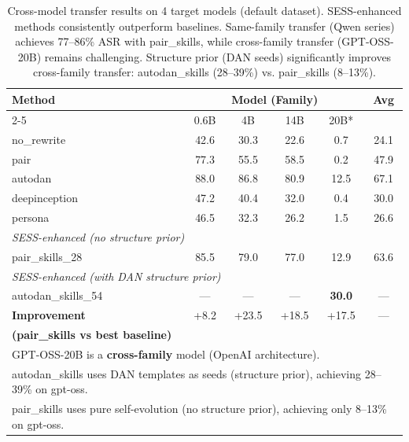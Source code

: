 \begin{table}[t]
\centering
\caption{Cross-model transfer results on 4 target models (default dataset). SESS-enhanced methods consistently outperform baselines. Same-family transfer (Qwen series) achieves 77--86\% ASR with pair\_skills, while cross-family transfer (GPT-OSS-20B) remains challenging. Structure prior (DAN seeds) significantly improves cross-family transfer: autodan\_skills (28--39\%) vs. pair\_skills (8--13\%).}
\label{tab:transfer_models}
\small
\begin{tabular}{lccccc}
\toprule
\textbf{Method} & \multicolumn{4}{c}{\textbf{Model (Family)}} & \textbf{Avg} \\
\cmidrule(lr){2-5}
 & 0.6B & 4B & 14B & 20B* & \\
\midrule
no\_rewrite & 42.6 & 30.3 & 22.6 & 0.7 & 24.1 \\
pair & 77.3 & 55.5 & 58.5 & 0.2 & 47.9 \\
autodan & 88.0 & 86.8 & 80.9 & 12.5 & 67.1 \\
deepinception & 47.2 & 40.4 & 32.0 & 0.4 & 30.0 \\
persona & 46.5 & 32.3 & 26.2 & 1.5 & 26.6 \\
\midrule
\multicolumn{6}{l}{\textit{SESS-enhanced (no structure prior)}} \\
pair\_skills\_28 & 85.5 & 79.0 & 77.0 & 12.9 & 63.6 \\
\midrule
\multicolumn{6}{l}{\textit{SESS-enhanced (with DAN structure prior)}} \\
autodan\_skills\_54 & --- & --- & --- & \textbf{30.0} & --- \\
\midrule
\textbf{Improvement} & +8.2 & +23.5 & +18.5 & +17.5 & --- \\
\textbf{(pair\_skills vs best baseline)} & & & & & \\
\bottomrule
\multicolumn{6}{l}{\small *GPT-OSS-20B is a \textbf{cross-family} model (OpenAI architecture).} \\
\multicolumn{6}{l}{\small autodan\_skills uses DAN templates as seeds (structure prior), achieving 28--39\% on gpt-oss.} \\
\multicolumn{6}{l}{\small pair\_skills uses pure self-evolution (no structure prior), achieving only 8--13\% on gpt-oss.} \\
\end{tabular}
\end{table}
